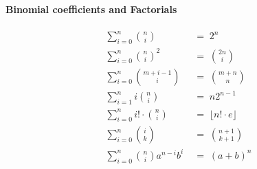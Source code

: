 \documentclass[a4paper, 11pt, reqno]{article}
\begin{document}
	\paragraph{Binomial coefficients and Factorials}
	\begin{align*}
		\sum_{i=0}^{n} \binom{n}{i}	\; &= \; 2^n 	\\
		\sum_{i=0}^{n} \binom{n}{i}^2	\; &= \; \binom{2n}{i}	\\
		\sum_{i=0}^{n} \binom{m + i - 1}{i}	\; &= \; \binom{m + n}{n}	\\
		\sum_{i=1}^{n} i\binom{n}{i}	\; &= \; n2^{n-1} 	\\
		\sum_{i=0}^{n} i!\cdot \binom{n}{i} \; &= \; \lfloor{n!\cdot e}\rfloor	\\
		\sum_{i=0}^{n} \binom{i}{k}	\; &= \; \binom{n + 1}{k + 1}	\\
		\sum_{i=0}^{n} \binom{n}{i}a^{n-i}b^{i}	\; &= \; (a + b)^n
	\end{align*}
	
	
\end{document}
